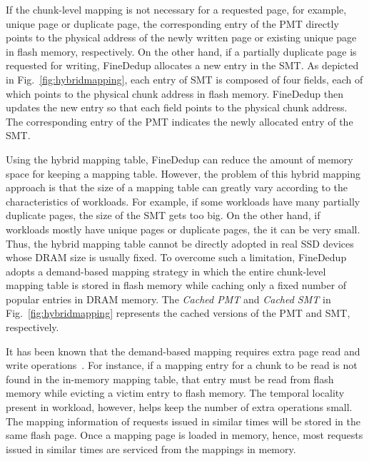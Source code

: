 If the chunk-level mapping is not necessary for a requested page, for example, unique page or duplicate page,
the corresponding entry of the PMT directly points to the physical address of the 
newly written page or existing unique page in flash memory, respectively.
On the other hand, if a partially duplicate page is requested for writing, 
FineDedup allocates a new entry in the SMT.
As depicted in Fig.~\ref{fig:hybridmapping},
each entry of SMT is composed of four fields, each of which points to the physical chunk address 
in flash memory.
FineDedup then updates the new entry so that each field points to the physical chunk address.
The corresponding entry of the PMT indicates the newly allocated entry of the SMT.

Using the hybrid mapping table, 
FineDedup can reduce the amount of memory space for keeping a mapping table.
However, the problem of this hybrid mapping approach is that 
the size of a mapping table can greatly vary according to the characteristics of workloads.
For example, if some workloads have many partially duplicate pages, 
the size of the SMT gets too big.
On the other hand, if workloads mostly have unique pages or duplicate pages, 
the it can be very small.
Thus, the hybrid mapping table cannot be directly adopted in real SSD devices whose DRAM size is usually fixed.
To overcome such a limitation, 
FineDedup adopts a demand-based mapping strategy in which
the entire chunk-level mapping table is stored in flash memory
while caching only a fixed number of popular entries in DRAM memory.
The \textit{Cached PMT} and \textit{Cached SMT} in Fig.~\ref{fig:hybridmapping} represents the cached versions of the
PMT and SMT, respectively.

It has been known that the demand-based mapping requires extra page read and write operations~\cite{dftl}.
For instance,
if a mapping entry for a chunk to be read is not found in the in-memory mapping table,
that entry must be read from flash memory while evicting a victim entry to flash memory.
The temporal locality present in workload, however, helps keep the number of extra operations small.
The mapping information of requests issued in similar times will be stored in the same flash page.
Once a mapping page is loaded in memory, hence,
most requests issued in similar times are serviced from the mappings in memory.

